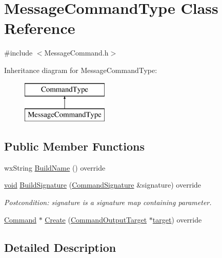 \hypertarget{class_message_command_type}{}\section{Message\+Command\+Type Class Reference}
\label{class_message_command_type}


{\ttfamily \#include $<$Message\+Command.\+h$>$}

Inheritance diagram for Message\+Command\+Type\+:\begin{figure}[H]
\begin{center}
\leavevmode
\includegraphics[height=2.000000cm]{class_message_command_type}
\end{center}
\end{figure}
\subsection*{Public Member Functions}
\begin{DoxyCompactItemize}
\item 
wx\+String \hyperlink{class_message_command_type_ad855bdefdc3bbca06e8bf6c027d283d2}{Build\+Name} () override
\item 
\hyperlink{sound_8c_ae35f5844602719cf66324f4de2a658b3}{void} \hyperlink{class_message_command_type_a954b9774a76c39f326f13166b6e6a615}{Build\+Signature} (\hyperlink{class_command_signature}{Command\+Signature} \&signature) override
\begin{DoxyCompactList}\small\item\em Postcondition\+: signature is a \textquotesingle{}signature\textquotesingle{} map containing parameter. \end{DoxyCompactList}\item 
\hyperlink{class_command}{Command} $\ast$ \hyperlink{class_message_command_type_a4aedf8e3aab44d7a145c64e4f0e1cb11}{Create} (\hyperlink{class_command_output_target}{Command\+Output\+Target} $\ast$\hyperlink{lib_2expat_8h_a15a257516a87decb971420e718853137}{target}) override
\end{DoxyCompactItemize}


\subsection{Detailed Description}



